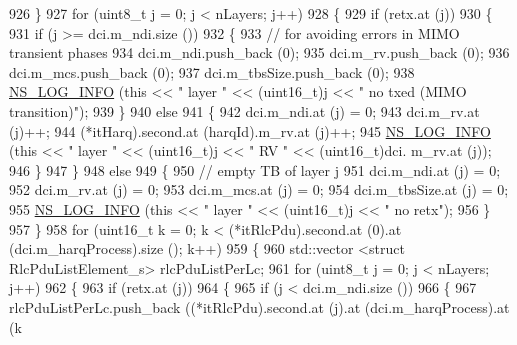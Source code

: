 \begin{DoxyCode}
926             \}
927           \textcolor{keywordflow}{for} (uint8\_t j = 0; j < nLayers; j++)
928             \{
929               \textcolor{keywordflow}{if} (retx.at (j))
930                 \{
931                   \textcolor{keywordflow}{if} (j >= dci.m\_ndi.size ())
932                     \{
933                       \textcolor{comment}{// for avoiding errors in MIMO transient phases}
934                       dci.m\_ndi.push\_back (0);
935                       dci.m\_rv.push\_back (0);
936                       dci.m\_mcs.push\_back (0);
937                       dci.m\_tbsSize.push\_back (0);
938                       \hyperlink{group__logging_gafbd73ee2cf9f26b319f49086d8e860fb}{NS\_LOG\_INFO} (\textcolor{keyword}{this} << \textcolor{stringliteral}{" layer "} << (uint16\_t)j << \textcolor{stringliteral}{" no txed (MIMO
       transition)"});
939                     \}
940                   \textcolor{keywordflow}{else}
941                     \{
942                       dci.m\_ndi.at (j) = 0;
943                       dci.m\_rv.at (j)++;
944                       (*itHarq).second.at (harqId).m\_rv.at (j)++;
945                       \hyperlink{group__logging_gafbd73ee2cf9f26b319f49086d8e860fb}{NS\_LOG\_INFO} (\textcolor{keyword}{this} << \textcolor{stringliteral}{" layer "} << (uint16\_t)j << \textcolor{stringliteral}{" RV "} << (uint16\_t)dci.
      m\_rv.at (j));
946                     \}
947                 \}
948               \textcolor{keywordflow}{else}
949                 \{
950                   \textcolor{comment}{// empty TB of layer j}
951                   dci.m\_ndi.at (j) = 0;
952                   dci.m\_rv.at (j) = 0;
953                   dci.m\_mcs.at (j) = 0;
954                   dci.m\_tbsSize.at (j) = 0;
955                   \hyperlink{group__logging_gafbd73ee2cf9f26b319f49086d8e860fb}{NS\_LOG\_INFO} (\textcolor{keyword}{this} << \textcolor{stringliteral}{" layer "} << (uint16\_t)j << \textcolor{stringliteral}{" no retx"});
956                 \}
957             \}
958           \textcolor{keywordflow}{for} (uint16\_t k = 0; k < (*itRlcPdu).second.at (0).at (dci.m\_harqProcess).size (); k++)
959             \{
960               std::vector <struct RlcPduListElement\_s> rlcPduListPerLc;
961               \textcolor{keywordflow}{for} (uint8\_t j = 0; j < nLayers; j++)
962                 \{
963                   \textcolor{keywordflow}{if} (retx.at (j))
964                     \{
965                       \textcolor{keywordflow}{if} (j < dci.m\_ndi.size ())
966                         \{
967                           rlcPduListPerLc.push\_back ((*itRlcPdu).second.at (j).at (dci.m\_harqProcess).at (k

\end{DoxyCode}
